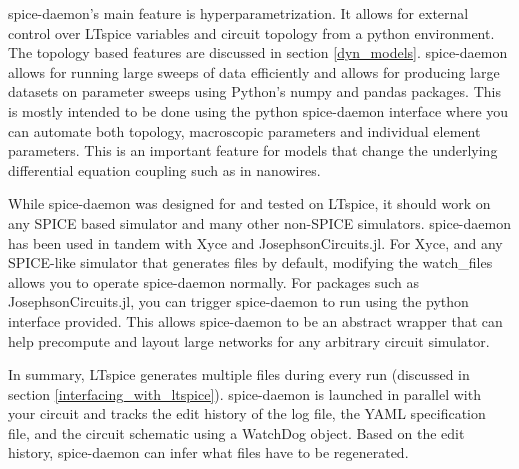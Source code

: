 \documentclass[]{article}
\newcommand{\todofig}[2][]{}
\newcommand{\todoidea}[2][]{}
\newcommand{\cf}[1]{\textsf{#1}}
\begin{document}
spice-daemon's main feature is hyperparametrization. It allows for external control
over LTspice variables and circuit topology from a python environment. The topology
based features are discussed in section \ref{dyn_models}. spice-daemon allows for 
running large sweeps of data efficiently and allows for producing large datasets
on parameter sweeps using Python's \cf{numpy} and \cf{pandas} packages. This is mostly
intended to be done using the python spice-daemon interface where you can automate
both topology, macroscopic parameters and individual element parameters. This is 
an important feature for models that change the underlying differential equation 
coupling such as in nanowires.

While spice-daemon was designed for and tested on LTspice, it should work on any
SPICE based simulator and many other non-SPICE simulators. spice-daemon has been
used in tandem with Xyce and JosephsonCircuits.jl. For Xyce, and any SPICE-like
simulator that generates files by default, modifying the \cf{watch\_files} allows you
to operate spice-daemon normally. For packages such as JosephsonCircuits.jl, you can
trigger spice-daemon to run using the python interface provided. This allows
spice-daemon to be an abstract wrapper that can help precompute and layout large
networks for any arbitrary circuit simulator.

In summary, LTspice generates multiple files during every run (discussed in section \ref{interfacing_with_ltspice}). spice-daemon is launched in parallel with your circuit
and tracks the edit history of the log file,
the YAML specification file, and the 
circuit schematic using a \cf{WatchDog} object. Based on the edit history, spice-daemon
can infer what files have to be regenerated.

\todoidea[inline]{Setting up a simulation, how is tran command and stepping handled}

\todoidea[inline]{setting up a spice-daemon simulation}

\todofig[inline]{Diagram of the listen and write files}


\end{document}
